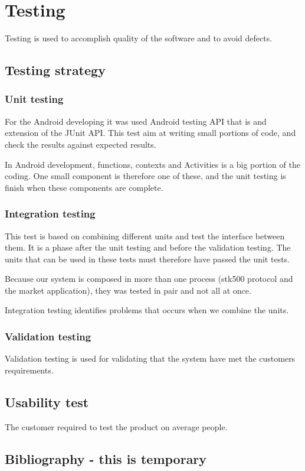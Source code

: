 \chapter{Testing}
	Testing is used to accomplish quality of the software and to avoid defects.
	
	\section{Testing strategy}
		\subsection{Unit testing}
			For the Android developing it was used Android testing API that is and extension of the JUnit API.
			This test aim at writing small portions of code, and check the results against expected results.

			In Android development, functions, contexts and Activities is a big portion of the coding.
			One small component is therefore one of these, and the unit testing is finish when these components are complete.

		\subsection{Integration testing}
			This test is based on combining different units and test the interface between them. It is a phase after the unit testing and before the validation testing. The units that can be used in these tests must therefore have passed the unit tests.

			Because our system is composed in more than one process (stk500 protocol and the market application), they 
			was tested in pair and not all at once.

			Integration testing identifies problems that occurs when we combine the units.

		\subsection{Validation testing}
			Validation testing is used for validating that the system have met the customers requirements.

	\section{Usability test}
		The customer required to test the product on average people.

\section{Bibliography - this is temporary}
	
